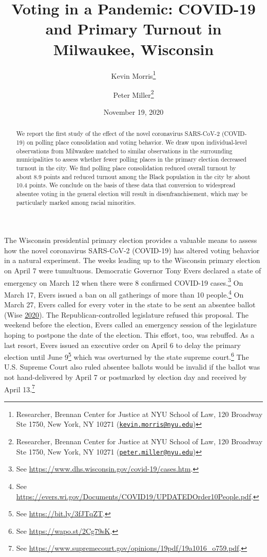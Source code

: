 \documentclass[
  12pt,
]{article}
\title{Voting in a Pandemic: COVID-19 and Primary Turnout in Milwaukee, Wisconsin}
\author{Kevin Morris\footnote{Researcher, Brennan Center for Justice at NYU School of Law, 120 Broadway Ste 1750, New York, NY 10271 (\href{mailto:kevin.morris@nyu.edu}{\nolinkurl{kevin.morris@nyu.edu}})} \and Peter Miller\footnote{Researcher, Brennan Center for Justice at NYU School of Law, 120 Broadway Ste 1750, New York, NY 10271 (\href{mailto:peter.miller@nyu.edu}{\nolinkurl{peter.miller@nyu.edu}})}}
\date{November 19, 2020}
\begin{document}
\maketitle
\begin{abstract}
We report the first study of the effect of the novel coronavirus SARS-CoV-2 (COVID-19) on polling place consolidation and voting behavior. We draw upon individual-level observations from Milwaukee matched to similar observations in the surrounding municipalities to assess whether fewer polling places in the primary election decreased turnout in the city. We find polling place consolidation reduced overall turnout by about 8.9 points and reduced turnout among the Black population in the city by about 10.4 points. We conclude on the basis of these data that conversion to widespread absentee voting in the general election will result in disenfranchisement, which may be particularly marked among racial minorities.
\end{abstract}

\pagebreak

\doublespacing

The Wisconsin presidential primary election provides a valuable means to assess how the novel coronavirus SARS-CoV-2 (COVID-19) has altered voting behavior in a natural experiment. The weeks leading up to the Wisconsin primary election on April 7 were tumultuous. Democratic Governor Tony Evers declared a state of emergency on March 12 when there were 8 confirmed COVID-19 cases.\footnote{See \url{https://www.dhs.wisconsin.gov/covid-19/cases.htm}.} On March 17, Evers issued a ban on all gatherings of more than 10 people.\footnote{See \url{https://evers.wi.gov/Documents/COVID19/UPDATEDOrder10People.pdf}.} On March 27, Evers called for every voter in the state to be sent an absentee ballot (Wise \protect\hyperlink{ref-Wise2020}{2020}). The Republican-controlled legislature refused this proposal. The weekend before the election, Evers called an emergency session of the legislature hoping to postpone the date of the election. This effort, too, was rebuffed. As a last resort, Evers issued an executive order on April 6 to delay the primary election until June 9\footnote{See \url{https://bit.ly/3fJTqZT}.} which was overturned by the state supreme court.\footnote{See \url{https://wapo.st/2Cg79sK}.} The U.S. Supreme Court also ruled absentee ballots would be invalid if the ballot was not hand-delivered by April 7 or postmarked by election day and received by April 13.\footnote{See \url{https://www.supremecourt.gov/opinions/19pdf/19a1016_o759.pdf}.}
\end{document}
